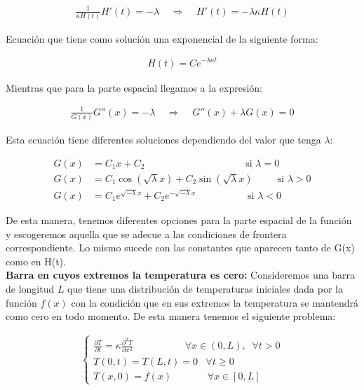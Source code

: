 \documentclass[12pt]{article}
\begin{document}
\begin{align*}
    \frac{1}{\kappa H(t)}H'(t) = -\lambda \;\;\;\; \Rightarrow \;\;\;\; H'(t) = -\lambda\kappa H(t)
\end{align*}

Ecuación que tiene como solución una exponencial de la siguiente forma:

\begin{align}
    H(t) = Ce^{-\lambda\kappa t}
\end{align}

Mientras que para la parte espacial llegamos a la expresión:

\begin{align*}
    \frac{1}{G(x)}G''(x) = -\lambda \;\;\;\; \Rightarrow \;\;\;\; G''(x) + \lambda G(x) = 0
\end{align*}

Esta ecuación tiene diferentes soluciones dependiendo del valor que tenga $\lambda$:

\begin{align}
    G(x) &= C_1x + C_2 \;\;\;\;\;\;\;\;\;\;\;\;\;\;\;\;\;\;\;\;\;\;\;\;\;\;\;\;\;\;\;\;\;\;\;\;\; \text{si }\lambda=0\\
    G(x) &= C_1\cos(\sqrt{\lambda}x) + C_2\sin(\sqrt{\lambda}x) \;\;\;\;\;\;\;\;\; \text{si }\lambda>0\\
    G(x) &= C_1e^{\sqrt{-\lambda}x} + C_2e^{-\sqrt{-\lambda}x} \;\;\;\;\;\;\;\;\;\;\;\;\;\;\;\;\;\;\; \text{si }\lambda<0
\end{align}

De esta manera, tenemos diferentes opciones para la parte espacial de la función y escogeremos aquella que se adecue a las condiciones de frontera correspondiente. Lo mismo sucede con las constantes que aparecen tanto de G(x) como en H(t). \\

\textbf{Barra en cuyos extremos la temperatura es cero:} Consideremos una barra de longitud $L$ que tiene una distribución de temperaturas iniciales dada por la función $f(x)$ con la condición que en sus extremos la temperatura se mantendrá como cero en todo momento. De esta manera tenemos el siguiente problema:

\begin{align}
    \begin{cases}
        \frac{\partial T}{\partial t} = \kappa \frac{\partial^2 T}{\partial x^2} \;\;\;\;\;\;\;\;\;\;\;\;\;\;\;\;\;\;\; \forall x\in (0,L), \;\; \forall t>0 \\
        T(0,t) = T(L,t) = 0 \;\;\; \forall t \geq 0 \\
        T(x,0) = f(x) \;\;\;\;\;\;\;\;\;\;\;\;\; \forall x\in [0,L]
    \end{cases}
\end{align}
\end{document}
